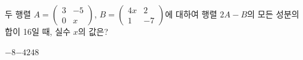 두 행렬 $A=\begin{pmatrix} 3 & -5 \\ 0 & x \end{pmatrix}$, $B=\begin{pmatrix} 4x & 2 \\ 1 & -7 \end{pmatrix}$에 대하여 행렬 $2A-B$의 모든 성분의 합이 16일 때, 실수 $x$의 값은?
\begin{choices32}{$-8$}{$-4$}{$2$}{$4$}{$8$}\end{choices32}
